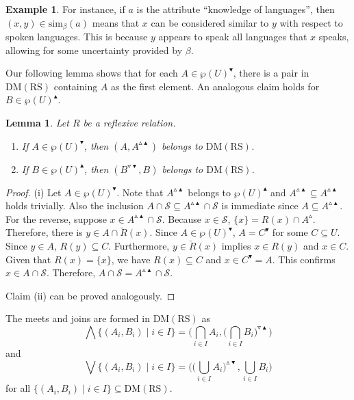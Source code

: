 \documentclass[11pt,a4paper]{amsart}
\newcommand{\UP}{\blacktriangle}
\newcommand{\DOWN}{\blacktriangledown}
\newcommand{\Up}{\vartriangle}
\newcommand{\Down}{\triangledown}
\theoremstyle{plain}
\newtheorem{lemma}[theorem]{Lemma}
\theoremstyle{definition}
\newtheorem{example}[theorem]{Example}
\theoremstyle{remark}
\numberwithin{equation}{section}
\begin{document}
\begin{example}
For instance, if $a$ is the attribute ``knowledge of
languages'', then $(x,y) \in \mathrm{sim}_\beta(a)$
means that $x$ can be considered similar to $y$ with respect to spoken languages. 
This is because $y$ appears to speak all languages that $x$ speaks, allowing for some uncertainty provided by $\beta$.
\end{example}

Our following lemma shows that for each $A \in \wp(U)^\DOWN$,
there is a pair in $\mathrm{DM(RS)}$ containing $A$ as the first
element. An analogous claim holds for $B \in \wp(U)^\UP$.

\begin{lemma} \label{lem:exists_pair}
Let $R$ be a reflexive relation. 
\begin{enumerate}[label={\rm (\roman*)}]
\item If $A \in \wp(U)^\DOWN$, then $(A,A^{\Up\UP})$ belongs to $\mathrm{DM(RS)}$.
\item If $B \in \wp(U)^\UP$, then $(B^{\Down\DOWN},B)$ belongs to $\mathrm{DM(RS)}$.
\end{enumerate}
\end{lemma}

\begin{proof}
(i) Let $A \in \wp(U)^\DOWN$. Note that $A^{\Up\UP}$ belongs 
to $\wp(U)^\UP$ and $A^{\Up \UP} \subseteq A^{\Up \UP}$ 
holds trivially. Also the inclusion  
$A \cap \mathcal{S} \subseteq A^{\Up \UP} \cap \mathcal{S}$ 
is immediate since $A \subseteq A^{\Up\UP}$.
For the reverse, suppose $x \in A^{\Up \UP} \cap \mathcal{S}$. 
Because $x \in \mathcal{S}$, $\{x\} = R(x) \cap A^\Up$.
Therefore, there is $y \in A \cap \breve{R}(x)$. Since
$A \in \wp(U)^\DOWN$, $A = C^\DOWN$ for some $C \subseteq U$.
Since $y \in A$, $R(y) \subseteq C$. Furthermore, $y \in \breve{R}(x)$ 
implies $x \in R(y)$ and $x \in C$. Given that $R(x) = \{x\}$, we have
$R(x) \subseteq C$ and $x \in C^\DOWN = A$. This confirms
$x \in A \cap \mathcal{S}$. Therefore,
$A \cap \mathcal{S} = A^{\Up \UP} \cap \mathcal{S}$.

Claim (ii) can be proved analogously. 
\end{proof}

The meets and joins are formed in $\mathrm{DM(RS)}$ as
\begin{equation} \label{Eq:Meet}
\bigwedge \{  ( A_i, B_i ) \mid i \in I \}  =
\Big ( \bigcap_{i \in I} A_i, \big ( \bigcap_{i \in I} B_i \big )^{\Down \UP} \Big )
\end{equation}
and
\begin{equation} \label{Eq:Join}
\bigvee \{  ( A_i, B_i ) \mid i \in I \}  =
\Big ( \big ( \bigcup_{i \in I} A_i \big )^{\Up \DOWN} , 
\bigcup_{i \in I} B_i \Big )
\end{equation}
for all $\{(A_i,B_i) \mid i \in I\} \subseteq \mathrm{DM(RS)}$.
\end{document}
